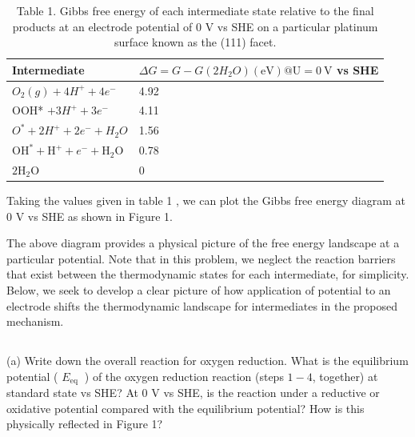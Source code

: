 \documentclass[12pt]{article}
\begin{document}
\begin{table}[h]
\begin{center}
\caption{Table 1. Gibbs free energy of each intermediate state relative to the final products at an electrode potential of 0 V vs SHE on a particular platinum surface known as the (111) facet.}
\begin{tabular}{|l|l|}
\hline
Intermediate & $\Delta G=G-G\left(2 H_{2} O\right)(\mathrm{eV}) @ \mathrm{U}=0 \mathrm{~V}$ vs SHE \\
\hline
$O_{2}(g)+4 H^{+}+4 e^{-}$ & 4.92 \\
\hline
OOH* $+3 H^{+}+3 e^{-}$ & 4.11 \\
\hline
$O^{*}+2 H^{+}+2 e^{-}+H_{2} O$ & 1.56 \\
\hline
$\mathrm{OH}^{*}+\mathrm{H}^{+}+e^{-}+\mathrm{H}_{2} \mathrm{O}$ & 0.78 \\
\hline
$2 \mathrm{H}_{2} \mathrm{O}$ & 0 \\
\hline
\end{tabular}
\end{center}
\end{table}

Taking the values given in table 1 , we can plot the Gibbs free energy diagram at 0 V vs SHE as shown in Figure 1.


The above diagram provides a physical picture of the free energy landscape at a particular potential. Note that in this problem, we neglect the reaction barriers that exist between the thermodynamic states for each intermediate, for simplicity. Below, we seek to develop a clear picture of how application of potential to an electrode shifts the thermodynamic landscape for intermediates in the proposed mechanism.\\
\subsection{}
(a) Write down the overall reaction for oxygen reduction. What is the equilibrium potential ( $E_{\text {eq }}$ ) of the oxygen reduction reaction (steps $1-4$, together) at standard state vs SHE? At 0 V vs SHE, is the reaction under a reductive or oxidative potential compared with the equilibrium potential? How is this physically reflected in Figure 1?\\
\end{document}
